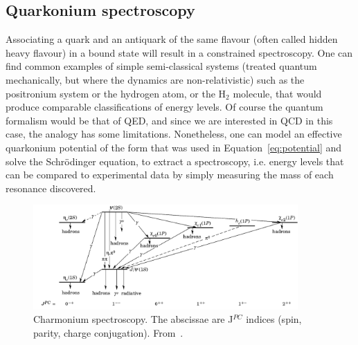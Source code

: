 






\subsection{Quarkonium spectroscopy}
\label{sec:spectro}
Associating a quark and an antiquark of the same flavour (often called
hidden heavy flavour) in a bound state will
result in a constrained spectroscopy. One can find common examples of
simple semi-classical systems (treated quantum mechanically, but where
the dynamics are non-relativistic) such as the positronium system or
the hydrogen atom, or the H$_{2}$ molecule, that would produce
comparable classifications of energy levels. Of course the quantum formalism
would be that of QED, and since we are interested in QCD in this case, the analogy
has some limitations. Nonetheless, one can model an effective
quarkonium potential of the form that was used in
Equation~\ref{eq:potential} and solve the Schrödinger equation, to
extract a spectroscopy, i.e. energy levels that can be compared to
experimental data by simply measuring the mass of each resonance
discovered. 
\\
\begin{figure}
\begin{center}
  \includegraphics[width=0.9\textwidth]{Chapters/pQuarkonia/charmonia.png}
  \caption{Charmonium spectroscopy. The abscissae are J$^{PC}$ indices
  (spin, parity, charge conjugation). From~\cite{spectro}.}
  \label{fig:charmonium}
\end{center}
\end{figure}
